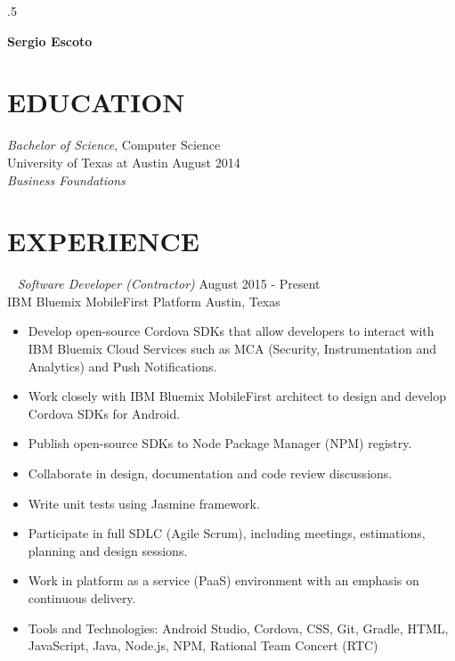 \documentclass[line,margin]{res}
\begin{document}
\moveleft.5\hoffset\centerline{\large\bf Sergio Escoto}
\address{ses110@utexas.edu $\mid$ github.com/ses110 $\mid$ (305) 213-4130}
 
\begin{resume}

\topmargin=-0.5in

\section{EDUCATION} {\sl Bachelor of Science}, Computer Science \\
                University of Texas at Austin \hfill August 2014 \\
                {\sl \small Business Foundations }

\section{EXPERIENCE} 
    {\sl Software Developer (Contractor)} \hfill August 2015 - Present \\
    { IBM Bluemix MobileFirst Platform } \hfill Austin, Texas \\
    \begin{itemize} \itemsep -2pt
    \item \small Develop open-source Cordova SDKs that allow developers to interact with IBM Bluemix Cloud Services such as MCA (Security, Instrumentation and Analytics) and Push Notifications.
    \item \small Work closely with IBM Bluemix MobileFirst architect to design and develop Cordova SDKs for Android.
    \item \small Publish open-source SDKs to Node Package Manager (NPM) registry.
    \item \small Collaborate in design, documentation and code review discussions.
    \item \small Write unit tests using Jasmine framework.
    \item \small Participate in full SDLC (Agile Scrum), including meetings, estimations, planning and design sessions.
    \item \small Work in platform as a service (PaaS) environment with an emphasis on continuous delivery.
    \item \small Tools and Technologies: Android Studio, Cordova, CSS, Git, Gradle, HTML, JavaScript, Java, Node.js, NPM, Rational Team Concert (RTC)


\end{itemize}
\end{resume}
\end{document}
